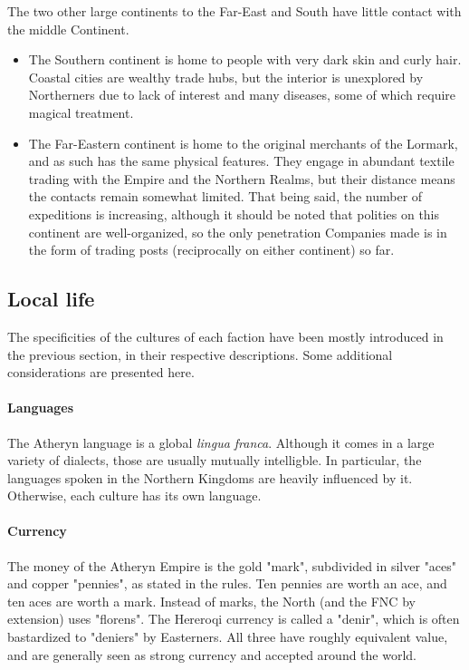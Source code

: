 The two other large continents to the Far-East and South have little contact with the middle Continent.

\begin{itemize}
    \item The Southern continent is home to people with very dark skin and curly hair. Coastal cities are wealthy trade hubs, but the interior is unexplored by Northerners due to lack of interest and many diseases, some of which require magical treatment.
    \item The Far-Eastern continent is home to the original merchants of the Lormark, and as such has the same physical features. They engage in abundant textile trading with the Empire and the Northern Realms, but their distance means the contacts remain somewhat limited. That being said, the number of expeditions is increasing, although it should be noted that polities on this continent are well-organized, so the only penetration Companies made is in the form of trading posts (reciprocally on either continent) so far.
\end{itemize}





\subsection{Local life}

The specificities of the cultures of each faction have been mostly introduced in the previous section, in their respective descriptions. Some additional considerations are presented here.

\paragraph{Languages}

The Atheryn language is a global \textit{lingua franca}. Although it comes in a large variety of dialects, those are usually mutually intelligble. In particular, the languages spoken in the Northern Kingdoms are heavily influenced by it. Otherwise, each culture has its own language.

\paragraph{Currency}

The money of the Atheryn Empire is the gold "mark", subdivided in silver "aces" and copper "pennies", as stated in the rules. Ten pennies are worth an ace, and ten aces are worth a mark. Instead of marks, the North (and the FNC by extension) uses "florens". The Hereroqi currency is called a "denir", which is often bastardized to "deniers" by Easterners. All three have roughly equivalent value, and are generally seen as strong currency and accepted around the world.


